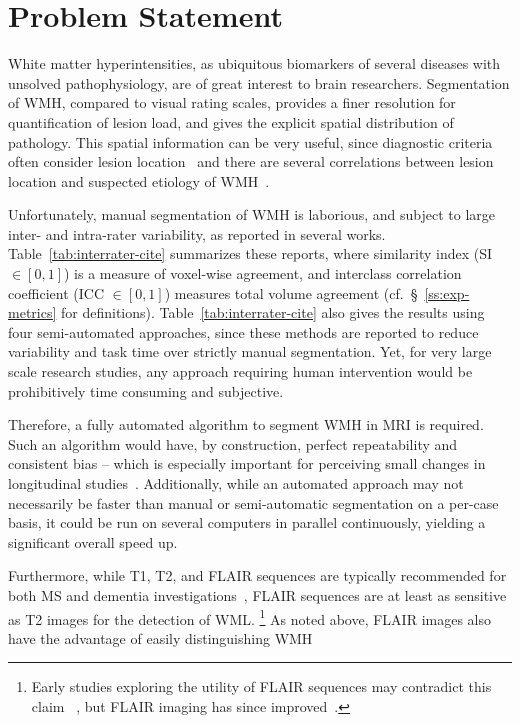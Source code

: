 \section{Problem Statement}
White matter hyperintensities,
as ubiquitous biomarkers of several diseases with unsolved pathophysiology,
are of great interest to brain researchers.
Segmentation of WMH, compared to visual rating scales, provides a finer resolution
for quantification of lesion load, and gives the explicit spatial distribution of pathology.
This spatial information can be very useful,
since diagnostic criteria often consider lesion location~\cite{Sorbi2012}
and there are several correlations between lesion location
and suspected etiology of WMH~\cite{Wardlaw2015,Kim2008}.
\par
Unfortunately, manual segmentation of WMH is
laborious, and subject to large inter- and intra-rater variability, as reported in several works.
Table~\ref{tab:interrater-cite} summarizes these reports,
where similarity index (SI $\in [0,1]$) is a measure of voxel-wise agreement,
and interclass correlation coefficient (ICC $\in [0,1]$) measures total volume agreement
(cf.~\S~\ref{ss:exp-metrics} for definitions).
Table~\ref{tab:interrater-cite} also gives the results using four semi-automated approaches,
since these methods are reported to reduce variability and task time
over strictly manual segmentation.
Yet, for very large scale research studies,
any approach requiring human intervention would be prohibitively time consuming and subjective.
\par
Therefore, a fully automated algorithm to segment WMH in MRI is required.
Such an algorithm would have, by construction,
perfect repeatability and consistent bias -- which is especially important
for perceiving small changes in longitudinal studies~\cite{MSISBI2015}.
Additionally, while an automated approach may not necessarily
be faster than manual or semi-automatic segmentation on a per-case basis,
it could be run on several computers in parallel continuously,
yielding a significant overall speed up.
\par
Furthermore, while T1, T2, and FLAIR sequences are typically recommended
for both MS and dementia investigations~\cite{Simon2006,Wardlaw2013,Traboulsee2015},
FLAIR sequences are at least as sensitive as T2 images for the detection of WML.%
\footnote{Early studies exploring the utility of FLAIR sequences may contradict this claim
~\cite{Okuda1999,Rovaris2000}, but FLAIR imaging has since improved~\cite{Wardlaw2015}.}
As noted above, FLAIR images also have the advantage of easily distinguishing WMH

